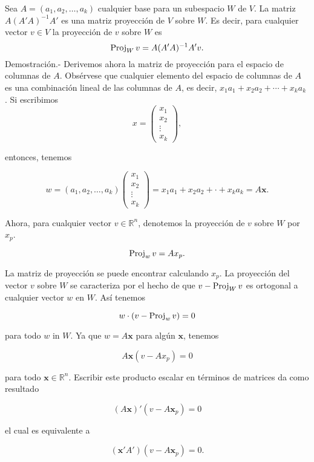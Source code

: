 \begin{teo}
    Sea $A=(a_1,a_2,\ldots,a_k)$ cualquier base para un subespacio $W$ de $V$. La matriz $A(A'A)^{-1}A'$ es una matriz proyección de $V$ sobre $W$. Es decir, para cualquier vector $v\in V$ la proyección de $v$ sobre $W$ es
    \begin{equation}
	\mathop{\mbox{\normalfont Proj}}\nolimits_W v=A(A'A)^{-1}A'v.
    \end{equation}
	Demostración.-\; Derivemos ahora la matriz de proyección para el espacio de columnas de $A$. Obsérvese que cualquier elemento del espacio de columnas de $A$ es una combinación lineal de las columnas de $A$, es decir, $x_1 a_1 + x_2 a_2 + \cdots + x_k a_k$ . Si escribimos
	$$
	x=
	\left(
	    \begin{array}{c}
		x_1\\
		x_2\\
		\vdots\\
		x_k
	    \end{array}
	\right),
	$$

	entonces, tenemos

	$$w=(a_1,a_2,\ldots,a_k)
	\left(
	    \begin{array}{c}
		x_1\\
		x_2\\
		\vdots\\
		x_k
	    \end{array}
	\right)
	=x_1a_1+x_2a_2+\cdot + x_ka_k=A\textbf{x}.$$

	Ahora, para cualquier vector $v\in \mathbb{R}^n$, denotemos la proyección de $v$ sobre $W$ por $x_p$.

	$$\mathop{\mbox{\normalfont Proj}}\nolimits_w v = Ax_p.$$

	La matriz de proyección se puede encontrar calculando $x_p$. La proyección del vector $v$ sobre $W$ se caracteriza por el hecho de que $v - \mathop{\mbox{\normalfont Proj}}\nolimits_W v$ es ortogonal a cualquier vector $w$ en $W$. Así tenemos

	$$w\cdot (v-\mathop{\mbox{\normalfont Proj}}\nolimits_w v)=0$$

	para todo $w$ in $W$. Ya que $w=A\textbf{x}$ para algún $\textbf{x}$, tenemos

	$$A\textbf{x}(v-Ax_p)=0$$

	para todo $\textbf{x}\in \mathbb{R}^n$. Escribir este producto escalar en términos de matrices da como resultado

	$$(A\textbf{x})'(v-A\textbf{x}_p)=0$$

	el cual es equivalente a

	$$(\textbf{x}'A')(v-A\textbf{x}_p)=0.$$


\end{teo}
